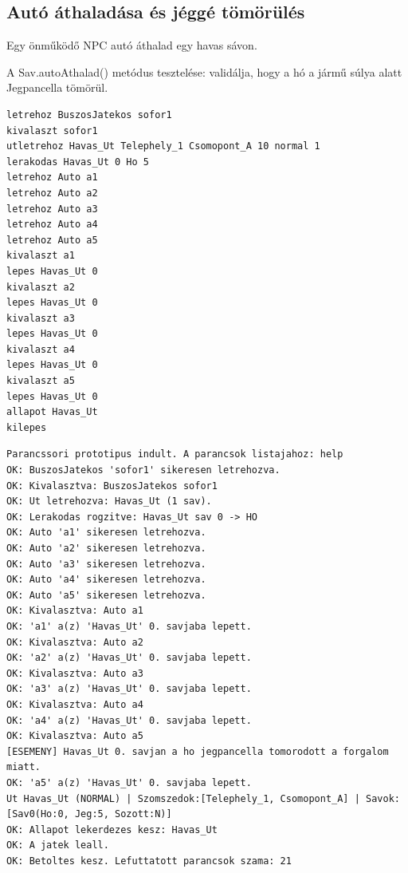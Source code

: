 \subsection{Autó áthaladása és jéggé tömörülés}
\begin{test-case-description}
    Egy önműködő NPC autó áthalad egy havas sávon.
\end{test-case-description}
\begin{test-case-function}
    A Sav.autoAthalad() metódus tesztelése: validálja, hogy a hó a jármű súlya alatt Jegpancella tömörül.
\end{test-case-function}
\begin{test-case-input}
\begin{verbatim}
letrehoz BuszosJatekos sofor1
kivalaszt sofor1
utletrehoz Havas_Ut Telephely_1 Csomopont_A 10 normal 1
lerakodas Havas_Ut 0 Ho 5
letrehoz Auto a1
letrehoz Auto a2
letrehoz Auto a3
letrehoz Auto a4
letrehoz Auto a5
kivalaszt a1
lepes Havas_Ut 0
kivalaszt a2
lepes Havas_Ut 0
kivalaszt a3
lepes Havas_Ut 0
kivalaszt a4
lepes Havas_Ut 0
kivalaszt a5
lepes Havas_Ut 0
allapot Havas_Ut
kilepes
\end{verbatim}
\end{test-case-input}
\begin{test-case-output}
\begin{verbatim}
Parancssori prototipus indult. A parancsok listajahoz: help
OK: BuszosJatekos 'sofor1' sikeresen letrehozva.
OK: Kivalasztva: BuszosJatekos sofor1
OK: Ut letrehozva: Havas_Ut (1 sav).
OK: Lerakodas rogzitve: Havas_Ut sav 0 -> HO
OK: Auto 'a1' sikeresen letrehozva.
OK: Auto 'a2' sikeresen letrehozva.
OK: Auto 'a3' sikeresen letrehozva.
OK: Auto 'a4' sikeresen letrehozva.
OK: Auto 'a5' sikeresen letrehozva.
OK: Kivalasztva: Auto a1
OK: 'a1' a(z) 'Havas_Ut' 0. savjaba lepett.
OK: Kivalasztva: Auto a2
OK: 'a2' a(z) 'Havas_Ut' 0. savjaba lepett.
OK: Kivalasztva: Auto a3
OK: 'a3' a(z) 'Havas_Ut' 0. savjaba lepett.
OK: Kivalasztva: Auto a4
OK: 'a4' a(z) 'Havas_Ut' 0. savjaba lepett.
OK: Kivalasztva: Auto a5
[ESEMENY] Havas_Ut 0. savjan a ho jegpancella tomorodott a forgalom miatt.
OK: 'a5' a(z) 'Havas_Ut' 0. savjaba lepett.
Ut Havas_Ut (NORMAL) | Szomszedok:[Telephely_1, Csomopont_A] | Savok: [Sav0(Ho:0, Jeg:5, Sozott:N)]
OK: Allapot lekerdezes kesz: Havas_Ut
OK: A jatek leall.
OK: Betoltes kesz. Lefuttatott parancsok szama: 21
\end{verbatim}
\end{test-case-output}

